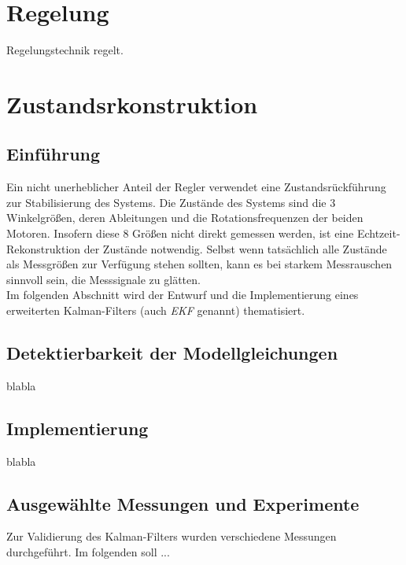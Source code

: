 \documentclass[times, 10pt,twocolumn]{article}
\begin{document}
	
	\section{Regelung}
	Regelungstechnik regelt. 
	
	\newpage
	\section{Zustandsrkonstruktion}
	\subsection{Einf\"uhrung}
	Ein nicht unerheblicher Anteil der Regler verwendet eine Zustandsr\"uckf\"uhrung zur Stabilisierung des Systems. Die Zust\"ande des Systems sind die 3 Winkelgr\"oßen, deren Ableitungen und die Rotationsfrequenzen der beiden Motoren. Insofern diese 8 Gr\"oßen nicht direkt gemessen werden, ist eine Echtzeit-Rekonstruktion der Zustände notwendig. 
	Selbst wenn tatsächlich alle Zustände als Messgrößen zur Verfügung stehen sollten, kann es bei starkem Messrauschen sinnvoll sein, die Messsignale zu glätten. \\
	Im folgenden Abschnitt wird der Entwurf und die Implementierung eines erweiterten Kalman-Filters (auch \textit{EKF} genannt)  thematisiert. 
	\subsection{Detektierbarkeit der Modellgleichungen}
	blabla
	\subsection{Implementierung}
	blabla 
	\subsection{Ausgewählte Messungen und Experimente}
	Zur Validierung des Kalman-Filters wurden verschiedene Messungen durchgeführt. Im folgenden soll ...
	


\nocite{ex1, ex2}
\end{document}

